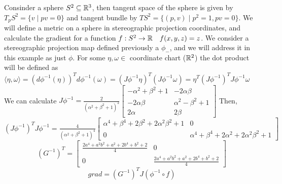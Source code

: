 \documentclass[11pt,a4paper]{report}
\begin{document}
\begin{Ex}
  Consinder a sphere $S^2 \subseteq \mathbb{R}^3$, then tangent space of the sphere is given by $T_p S^2 = \{ v \; | \; p v = 0 \}$
  and tangent bundle by $TS^2 = \{ (p,v) \; | \; p^2 = 1, p v = 0 \}$. We will define a metric on a sphere in stereographic projection coordinates, and calculate the gradient for a function
  $f: S^2 \to \mathbb{R} \quad f(x,y,z) = z$. We consider a stereographic projection map defined previously a $\phi_{-}$, and we will address it in this example as just $\phi$.
  For some $\eta, \omega \in$ coordinate chart ($\mathbb{R}^2$) the dot product will be defined as $\langle \eta, \omega \rangle = (d\phi^{-1}(\eta))^T d\phi^{-1}(\omega) = 
  (J\phi^{-1} \eta)^T (J \phi^{-1} \omega) = \eta^T (J\phi^{-1})^T J\phi^{-1} \omega $ \newline
  We can calculate $J \phi^{-1} = \frac{2}{(\alpha^2 + \beta^2 + 1)^2} \begin{bmatrix} -\alpha^2 + \beta^2 +1  & -2\alpha \beta \\ -2 \alpha \beta & \alpha^2 - \beta^2 +1 \\ 2\alpha & 2\beta \end{bmatrix}$
  Then, $ (J\phi^{-1})^T J\phi^{-1} = \frac{4}{ (\alpha^2+\beta^2+1)^4} \begin{bmatrix} \alpha^4 + \beta^4 + 2 \beta^2 + 2 \alpha^2\beta^2 +1 & 0 \\ 0 & \alpha^4 + \beta^4 +2 \alpha^2 + 2\alpha^2\beta^2 + 1 \end{bmatrix} $
  \newline
  $$ (G^{-1})^T = \begin{bmatrix} \frac{2a^4 + a^2 b^2 + a^2 +2b^4 + b^2 +2}{4} & 0 \\ 0 & \frac{2a^4 + a^2b^2 + a^2 + 2b^4 + b^2 +2}{4} \end{bmatrix}$$
  $$ grad = (G^{-1})^T J(\phi^{-1} \circ f) $$
\end{Ex}

 
\end{document}
